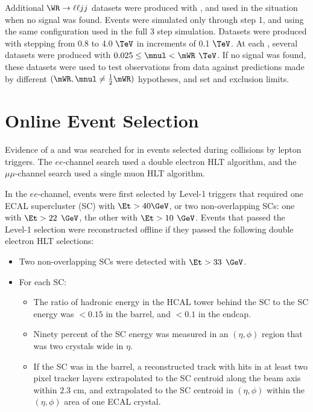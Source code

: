 Additional $\WR \rightarrow \ell\ell jj$ datasets were produced with \PYTHIA, and used in the situation when no \WR 
signal was found.  Events were simulated only through step 1, and using the same \PYTHIA configuration used in the 
full 3 step simulation.  Datasets were produced with \mWR stepping from 0.8 to 4.0 $\TeV$ in increments of 0.1 $\TeV$.  
At each \mWR, several datasets were produced with $0.025 \leq \mnul < \mWR$ $\TeV$.  If no \WR signal was found, these 
datasets were used to test observations from data against predictions made by different $(\mWR, \mnul \neq \frac{1}{2}\mWR)$ 
hypotheses, and set \mWR and \mnul exclusion limits.


\section{Online Event Selection}
\label{sec:triggers}
Evidence of a \WR and \nul was searched for in events selected during collisions by lepton triggers.  The $ee$-channel 
search used a double electron HLT algorithm, and the $\mu\mu$-channel search used a single muon HLT algorithm.

In the $ee$-channel, events were first selected by Level-1 triggers that required one ECAL supercluster (SC) 
with $\Et > 40 \GeV$, or two non-overlapping SCs: one with $\Et > 22$ $\GeV$, the other with $\Et > 10$ $\GeV$.  
Events that passed the Level-1 selection were reconstructed offline if they passed the following double electron 
HLT selections:

\begin{itemize}
	\item Two non-overlapping SCs were detected with $\Et > 33$ $\GeV$.
	\item For each SC:
	\begin{itemize}
		\item The ratio of hadronic energy in the HCAL tower behind the SC to the SC energy was $< 0.15$ in the barrel, and $< 0.1$ in the endcap.
		\item Ninety percent of the SC energy was measured in an $(\eta, \phi)$ region that was two crystals wide in $\eta$.
		\item If the SC was in the barrel, a reconstructed track with hits in at least two pixel tracker layers extrapolated to the SC 
			centroid along the beam axis within $2.3$ cm, and extrapolated to the SC centroid in $(\eta, \phi)$ within the $(\eta, \phi)$ 
			area of one ECAL crystal.
	\end{itemize}
\end{itemize}

